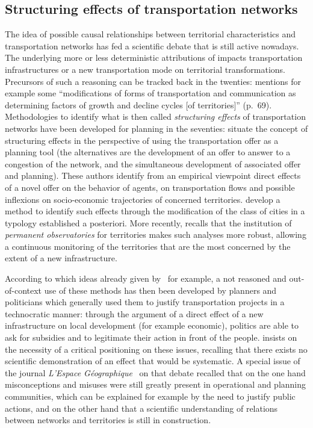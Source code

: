 \subsection{Structuring effects of transportation networks}

The idea of possible causal relationships between territorial characteristics and transportation networks has fed a scientific debate that is still active nowadays. The underlying  more or less deterministic attributions of impacts  transportation infrastructures or  a new transportation mode on territorial transformations. Precursors of such a reasoning can be tracked back in the twenties: \cite{burgess1925city} mentions for example some ``modifications of forms of transportation and communication as determining factors of growth and decline cycles [of territories]'' (p.~69). Methodologies to identify what is then called \emph{structuring effects} of transportation networks have been developed for planning in the seventies: \cite{bonnafous1974methodologies} situate the concept of structuring effects in the perspective of using the transportation offer as a planning tool (the alternatives are the development of an offer to answer to a congestion of the network, and the simultaneous development of associated offer and planning). These authors identify from an empirical viewpoint direct effects of a novel offer on the behavior of agents, on transportation flows and possible inflexions on socio-economic trajectories of concerned territories. \cite{bonnafous1974detection} develop a method to identify such effects through the modification of the class of cities in a typology established a posteriori. More recently, \cite{bonnafous2014observatoires} recalls that the institution of \emph{permanent observatories} for territories makes such analyses more robust, allowing a continuous monitoring of the territories that are the most concerned by the extent of a new infrastructure.

According to \cite{offner1993effets} which  ideas already given by~\cite{franccois1977autoroutes} for example, a not reasoned and out-of-context use of these methods has then been developed by planners and politicians which generally used them to justify transportation projects in a technocratic manner: through the argument of a direct effect of a new infrastructure on local development (for example economic), politics are able to ask for subsidies and to legitimate their action in front of the people. \cite{offner1993effets} insists on the necessity of a critical positioning on these issues, recalling that there exists no scientific demonstration of an effect that would be systematic. A special issue of the journal \emph{L'Espace Géographique}~\citep{espacegeo2014effets} on that debate recalled that on the one hand misconceptions and misuses were still greatly present in operational and planning communities, which can be explained for example by the need to justify public actions, and on the other hand that a scientific understanding of relations between networks and territories is still in construction. 


